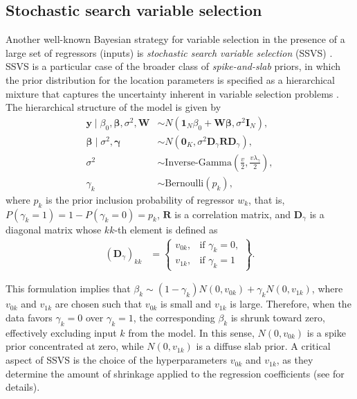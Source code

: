 \subsection{Stochastic search variable selection}\label{sec13_22}
Another well-known Bayesian strategy for variable selection in the presence of a large set of regressors (inputs) is \textit{stochastic search variable selection} (SSVS) \cite{george1993variable,George1997}. SSVS is a particular case of the broader class of \textit{spike-and-slab} priors, in which the prior distribution for the location parameters is specified as a hierarchical mixture that captures the uncertainty inherent in variable selection problems \cite{Ishwaran2005}. The hierarchical structure of the model is given by
\begin{align*}
	\mathbf{y} \mid \beta_0, \boldsymbol{\beta}, \sigma^2, \mathbf{W} &\sim {N}(\mathbf{1}_N \beta_0  + \mathbf{W} \boldsymbol{\beta}, \sigma^2 \mathbf{I}_N), \\
	\boldsymbol{\beta} \mid \sigma^2, \boldsymbol{\gamma} &\sim {N}(\mathbf{0}_K, \sigma^2 \mathbf{D}_{\gamma} \mathbf{R} \mathbf{D}_{\gamma}), \\
	\sigma^2 &\sim \text{Inverse-Gamma}\left(\frac{v}{2}, \frac{v\lambda_{\gamma}}{2}\right), \\
	\gamma_k &\sim \text{Bernoulli}(p_k),
\end{align*}
where \(p_k\) is the prior inclusion probability of regressor \(w_k\), that is, \(P(\gamma_k = 1) = 1 - P(\gamma_k = 0) = p_k\), \(\mathbf{R}\) is a correlation matrix, and \(\mathbf{D}_{\gamma}\) is a diagonal matrix whose \(kk\)-th element is defined as
\begin{align*}
	(\mathbf{D}_{\gamma})_{kk} &= 
	\begin{Bmatrix}
		v_{0k}, & \text{if } \gamma_k = 0, \\
		v_{1k}, & \text{if } \gamma_k = 1
	\end{Bmatrix}.
\end{align*}

This formulation implies that \(\beta_k \sim (1 - \gamma_k) {N}(0, v_{0k}) + \gamma_k {N}(0, v_{1k})\), where \(v_{0k}\) and \(v_{1k}\) are chosen such that \(v_{0k}\) is small and \(v_{1k}\) is large. Therefore, when the data favors \(\gamma_k = 0\) over \(\gamma_k = 1\), the corresponding \(\beta_k\) is shrunk toward zero, effectively excluding input \(k\) from the model. In this sense, \({N}(0, v_{0k})\) is a spike prior concentrated at zero, while \({N}(0, v_{1k})\) is a diffuse slab prior. A critical aspect of SSVS is the choice of the hyperparameters \(v_{0k}\) and \(v_{1k}\), as they determine the amount of shrinkage applied to the regression coefficients (see \cite{george1993variable,George1997} for details).

